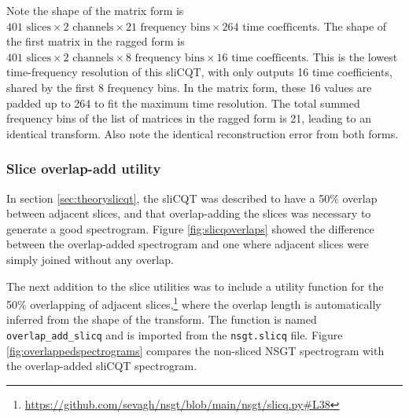 \documentclass[report.tex]{subfiles}
\begin{document}
Note the shape of the matrix form is $401 \text{ slices} \times 2 \text{ channels} \times 21 \text{ frequency bins} \times 264 \text{ time coefficents}$. The shape of the first matrix in the ragged form is $401 \text{ slices} \times 2 \text{ channels} \times 8 \text{ frequency bins} \times 16 \text{ time coefficents}$. This is the lowest time-frequency resolution of this sliCQT, with only outputs 16 time coefficients, shared by the first 8 frequency bins. In the matrix form, these 16 values are padded up to 264 to fit the maximum time resolution. The total summed frequency bins of the list of matrices in the ragged form is 21, leading to an identical transform. Also note the identical reconstruction error from both forms.

\subsubsection{Slice overlap-add utility}
\label{sec:slicqola}

In section \ref{sec:theoryslicqt}, the sliCQT was described to have a 50\% overlap between adjacent slices, and that overlap-adding the slices was necessary to generate a good spectrogram. Figure \ref{fig:slicqoverlaps} showed the difference between the overlap-added spectrogram and one where adjacent slices were simply joined without any overlap.

The next addition to the slice utilities was to include a utility function for the 50\% overlapping of adjacent slices,\footnote{\url{https://github.com/sevagh/nsgt/blob/main/nsgt/slicq.py\#L38}} where the overlap length is automatically inferred from the shape of the transform. The function is named \Verb#overlap_add_slicq# and is imported from the \Verb#nsgt.slicq# file. Figure \ref{fig:overlappedspectrograms} compares the non-sliced NSGT spectrogram with the overlap-added sliCQT spectrogram.
\end{document}
